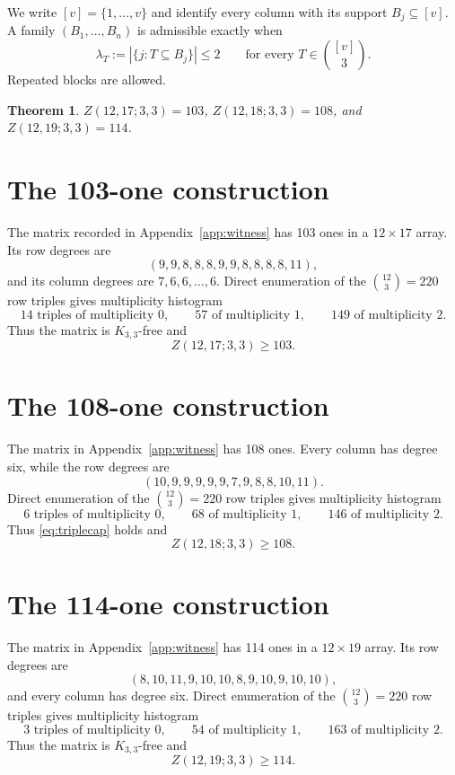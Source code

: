 \documentclass[11pt]{article}
\newtheorem{theorem}{Theorem}
\begin{document}
We write $[v]=\{1,\ldots,v\}$ and identify every column with its support $B_j\subseteq[v]$. A family $(B_1,\ldots,B_n)$ is admissible exactly when
\begin{equation}
\lambda_T:=|\{j:T\subseteq B_j\}|\le2
\qquad\text{for every }T\in\binom{[v]}{3}.
\label{eq:triplecap}
\end{equation}
Repeated blocks are allowed.

\begin{theorem}
\label{thm:main}
$Z(12,17;3,3)=103$, $Z(12,18;3,3)=108$, and $Z(12,19;3,3)=114$.
\end{theorem}

\section{The 103-one construction}
The matrix recorded in Appendix~\ref{app:witness} has 103 ones in a
$12\times17$ array. Its row degrees are
\[
(9,9,8,8,8,9,9,8,8,8,8,11),
\]
and its column degrees are $7,6,6,\ldots,6$. Direct enumeration of the
$\binom{12}3=220$ row triples gives multiplicity histogram
\[
14\text{ triples of multiplicity }0,\qquad
57\text{ of multiplicity }1,\qquad
149\text{ of multiplicity }2.
\]
Thus the matrix is $K_{3,3}$-free and
\begin{equation}
Z(12,17;3,3)\ge103.
\label{eq:lower1217}
\end{equation}

\section{The 108-one construction}
The matrix in Appendix~\ref{app:witness} has 108 ones. Every column has degree six, while the row degrees are
\[
(10,9,9,9,9,9,7,9,8,8,10,11).
\]
Direct enumeration of the $\binom{12}3=220$ row triples gives multiplicity histogram
\[
6\text{ triples of multiplicity }0,\qquad
68\text{ of multiplicity }1,\qquad
146\text{ of multiplicity }2.
\]
Thus \eqref{eq:triplecap} holds and
\begin{equation}
Z(12,18;3,3)\ge108.
\label{eq:lower}
\end{equation}

\section{The 114-one construction}
The matrix in Appendix~\ref{app:witness} has 114 ones in a
$12\times19$ array. Its row degrees are
\[
(8,10,11,9,10,10,8,9,10,9,10,10),
\]
and every column has degree six. Direct enumeration of the
$\binom{12}3=220$ row triples gives multiplicity histogram
\[
3\text{ triples of multiplicity }0,\qquad
54\text{ of multiplicity }1,\qquad
163\text{ of multiplicity }2.
\]
Thus the matrix is $K_{3,3}$-free and
\begin{equation}
Z(12,19;3,3)\ge114.
\label{eq:lower1219}
\end{equation}
\end{document}
